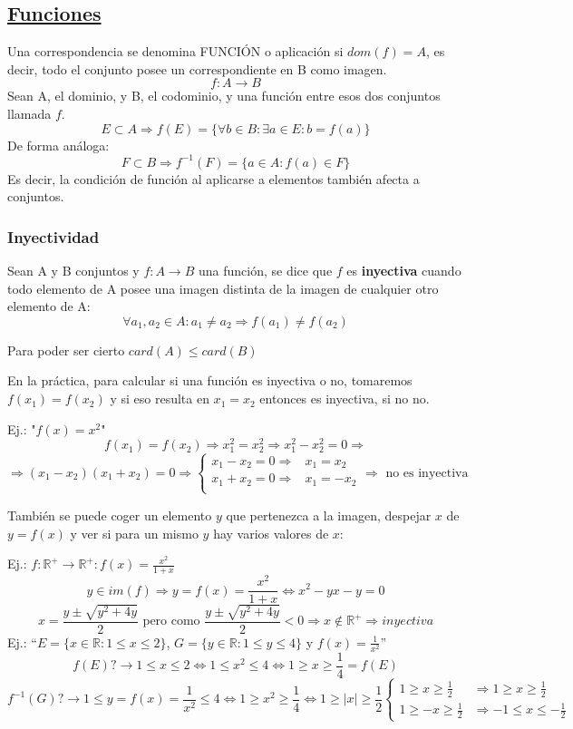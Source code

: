 \documentclass[10pt,a4paper,openright]{book}
\begin{document}
\subsection*{\underline{Funciones}}
Una correspondencia se denomina FUNCIÓN o aplicación si $dom(f)=A$, es decir, todo el conjunto posee un correspondiente en B como imagen.
$$f: A\rightarrow B$$
Sean A, el dominio, y B, el codominio, y una función entre esos dos conjuntos llamada $f$.
$$E\subset A\Rightarrow f(E)=\{\forall b\in B : \exists a \in E : b=f(a)\}$$
De forma análoga:
$$F\subset B\Rightarrow f^{-1}(F)=\{a \in A : f(a)\in F\}$$
Es decir, la condición de función al aplicarse a elementos también afecta a conjuntos.
\subsubsection*{Inyectividad}
Sean A y B conjuntos y $f: A \rightarrow B$ una función, se dice que $f$ es \textbf{inyectiva} cuando todo elemento de A posee una imagen distinta de la imagen de cualquier otro elemento de A:
$$\forall a_1, a_2 \in A : a_1 \neq a_2\Rightarrow f(a_1)\neq f(a_2)$$

Para poder ser cierto $card(A)\leq card(B)$\par

En la práctica, para calcular si una función es inyectiva o no, tomaremos $f(x_1)=f(x_2)$ y si eso resulta en $x_1=x_2$ entonces es inyectiva, si no no.\par

Ej.:  "$f(x)=x^2$"
$$f(x_1)=f(x_2)\Rightarrow x_1^2=x_2^2\Rightarrow x_1^2-x_2^2=0 \Rightarrow$$
$$\Rightarrow (x_1-x_2)(x_1+x_2)=0 \Rightarrow
\begin{cases}
x_1-x_2=0 \Rightarrow & x_1=x_2 \\
x_1+x_2=0 \Rightarrow & x_1=-x_2 \\
\end{cases}
\Rightarrow \mbox{ no es inyectiva}$$

También se puede coger un elemento $y$ que pertenezca a la imagen, despejar $x$ de $y=f(x)$ y ver si para un mismo $y$ hay varios valores de $x$:\par
Ej.: $f: \mathbb R^+ \rightarrow \mathbb R^+ : f(x)=\frac{x^2}{1+x}$
$$y\in im(f)\Rightarrow y=f(x)=\frac{x^2}{1+x}\Leftrightarrow x^2-yx-y=0$$
$$x=\frac{y\pm \sqrt{y^2+4y}}{2}\mbox{ pero como }\frac{y\pm \sqrt{y^2+4y}}{2}<0\Rightarrow x\notin \mathbb R^+\Rightarrow inyectiva$$
Ej.: ``$E=\{x\in \mathbb R : 1\leq x\leq 2\}$, $G=\{y\in \mathbb R : 1\leq y\leq 4\}$ y $f(x)=\frac{1}{x^2}$''
$$f(E)?\rightarrow 1\leq x\leq 2\Leftrightarrow 1\leq x^2\leq 4\Leftrightarrow 1\geq x\geq \frac{1}{4}=f(E)$$
$$f^{-1}(G)?\rightarrow 1\leq y=f(x)=\frac{1}{x^2}\leq 4\Leftrightarrow 1\geq x^2\geq \frac{1}{4}\Leftrightarrow 1\geq |x|\geq \frac{1}{2} 
\begin{cases}
1\geq x\geq \frac{1}{2}& \Rightarrow 1\geq x\geq \frac{1}{2} \\
1\geq -x\geq \frac{1}{2}& \Rightarrow -1\leq x\leq -\frac{1}{2}
\end{cases}$$
\end{document}
